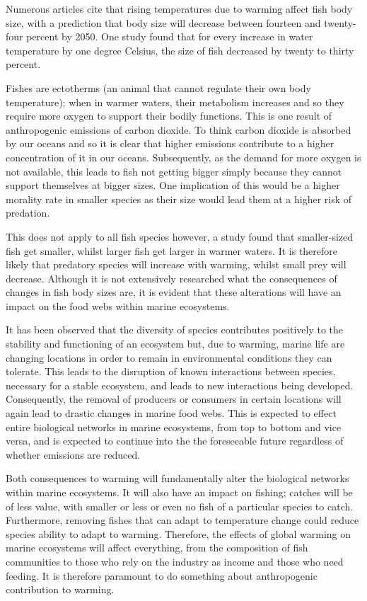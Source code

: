 \documentclass{article}
\begin{document}
Numerous articles cite that rising temperatures due to warming affect fish body size, with a prediction that body size will decrease between fourteen and twenty-four percent by 2050. One study found that for every increase in water temperature by one degree Celsius, the size of fish decreased by twenty to thirty percent. 

Fishes are ectotherms (an animal that cannot regulate their own body temperature); when in warmer waters, their metabolism increases and so they require more oxygen to support their bodily functions. This is one result of anthropogenic emissions of carbon dioxide. To think carbon dioxide is absorbed by our oceans and so it is clear that higher emissions contribute to a higher concentration of it in our oceans. Subsequently, as the demand for more oxygen is not available, this leads to fish not getting bigger simply because they cannot support themselves at bigger sizes. One implication of this would be a higher morality rate in smaller species as their size would lead them at a higher risk of predation. 

This does not apply to all fish species however, a study found that smaller-sized fish get smaller, whilst larger fish get larger in warmer waters. It is therefore likely that predatory species will increase with warming, whilst small prey will decrease. Although it is not extensively researched what the consequences of changes in fish body sizes are, it is evident that these alterations will have an impact on the food webs within marine ecosystems.

It has been observed that the diversity of species contributes positively to the stability and functioning of an ecosystem but, due to warming, marine life are changing locations in order to remain in environmental conditions they can tolerate. This leads to the disruption of known interactions between species, necessary for a stable ecosystem, and leads to new interactions being developed. Consequently, the removal of producers or consumers in certain locations will again lead to drastic changes in marine food webs. This is expected to effect entire biological networks in marine ecosystems, from top to bottom and vice versa, and is expected to continue into the the foreseeable future regardless of whether emissions are reduced.

Both consequences to warming will fundamentally alter the biological networks within marine ecosystems. It will also have an impact on fishing; catches will be of less value, with smaller or less or even no fish of a particular species to catch. Furthermore, removing fishes that can adapt to temperature change could reduce species ability to adapt to warming. Therefore, the effects of global warming on marine ecosystems will affect everything, from the composition of fish communities to those who rely on the industry as income and those who need feeding. It is therefore paramount to do something about anthropogenic contribution to warming.  
\end{document}
